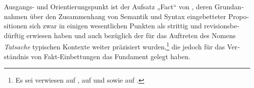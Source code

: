 \documentclass[output=paper]{langscibook}
\begin{document}
\begin{otherlanguage}{german}
    \z
\z

\noindent Ausgangs- und Orientierungspunkt ist der Aufsatz „Fact“ von \citet{kiparsky1970fact}, deren Grundannahmen über den Zusammenhang von Semantik und Syntax eingebetteter Propositionen sich zwar in einigen wesentlichen Punkten als strittig und revisionsbedürftig erwiesen haben und auch bezüglich der für das Auftreten des Nomens \textit{Tatsache} typischen Kontexte weiter präzisiert wurden,\footnote{Es sei verwiesen auf \citet{poldauf1972fact-and-non-fact, poldauf1972factive-implicative-evaluative-predicates, poldauf1976fact-non-fact-and-the-place-of-phasal-and-some-other-expressions}, auf \citet{wilkinson1970factive-complements-and-action-complements} und \citet{norrick1978factive-adjectives-and-the-theory-of-factivity} sowie auf \citet{reis1977prasuppositionen-und-syntax}.} die jedoch für das Verständnis von Fakt-Einbettungen das Fundament gelegt haben.


\end{otherlanguage}
\end{document}
